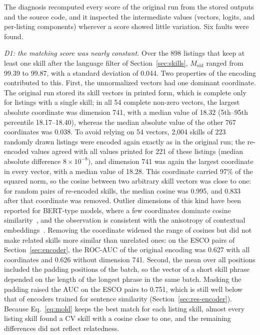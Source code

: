 \documentclass[CHICAGO]{USG}
\begin{document}
The diagnosis recomputed every score of the original run from the stored outputs and the source code, and it inspected the intermediate values (vectors, logits, and per-listing components) wherever a score showed little variation. Six faults were found.

\emph{D1: the matching score was nearly constant.} Over the 898 listings that keep at least one skill after the language filter of Section~\ref{sec:skills}, $M_{\mathrm{old}}$ ranged from 99.39 to 99.87, with a standard deviation of 0.044. %
Two properties of the encoding contributed to this. First, the unnormalized vectors had one dominant coordinate. The original run stored its skill vectors in printed form, which is complete only for listings with a single skill; in all 54 complete non-zero vectors, the largest absolute coordinate was dimension 741, with a median value of 18.32 (5th--95th percentile 18.17--18.40), whereas the median absolute value of the other 767 coordinates was 0.038. %
To avoid relying on 54 vectors, 2{,}004 skills of 223 randomly drawn listings were encoded again exactly as in the original run; the re-encoded values agreed with all values printed for 221 of these listings (median absolute difference $8\times10^{-8}$), and dimension 741 was again the largest coordinate in every vector, with a median value of 18.28. %
This coordinate carried 97\% of the squared norm, so the cosine between two arbitrary skill vectors was close to one: for random pairs of re-encoded skills, the median cosine was 0.995, and 0.833 after that coordinate was removed. %
Outlier dimensions of this kind have been reported for BERT-type models, where a few coordinates dominate cosine similarity~\citep{kovaleva2021,timkey2021}, and the observation is consistent with the anisotropy of contextual embeddings~\citep{ethayarajh2019}. Removing the coordinate widened the range of cosines but did not make related skills more similar than unrelated ones: on the ESCO pairs of Section~\ref{sec:encoder}, the ROC-AUC of the original encoding was 0.627 with all coordinates and 0.626 without dimension 741. %
Second, the mean over all positions included the padding positions of the batch, so the vector of a short skill phrase depended on the length of the longest phrase in the same batch. Masking the padding raised the AUC on the ESCO pairs to 0.751, which is still well below that of encoders trained for sentence similarity (Section~\ref{sec:res-encoder}). %
Because Eq.~\eqref{eq:mold} keeps the best match for each listing skill, almost every listing skill found a CV skill with a cosine close to one, and the remaining differences did not reflect relatedness.
\end{document}
